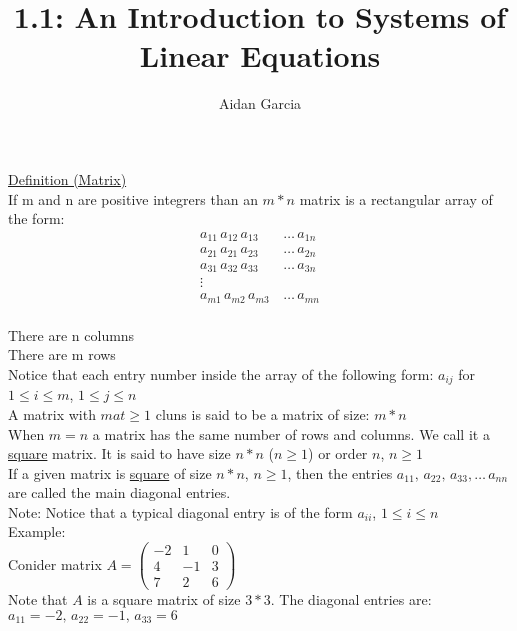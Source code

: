 \documentclass{jhwhw}
\author{Aidan Garcia}
\title{1.1: An Introduction to Systems of Linear Equations}
\begin{document}
\underline{Definition (Matrix)} \\
If m and n are positive integrers than an \(m*n\) matrix is a rectangular array of the form:\\

\begin{align*} 
a_{11}\, a_{12}\, a_{13} \, &\ldots \, a_{1n}\\
a_{21} \, a_{21} \, a_{23} \, &\ldots \, a_{2n}\\
a_{31} \, a_{32} \, a_{33} \, &\ldots \, a_{3n}\\
\vdots\\
a_{m1} \, a_{m2} \, a_{m3} \, &\ldots \, a_{mn}\\
\end{align*}

There are n columns\\
There are m rows\\

Notice that each entry {number inside the array} of the following form: \(a_{ij}\) for \(1 \leq i \leq m\), \(1 \leq j \leq n\)\\

A matrix with \(mat \geq 1\) cluns is said to be a matrix of size: \(m*n\)\\

When \(m=n\) a matrix has the same number of rows and columns. We call it a \underline{square} matrix. It is said to have size \(n*n\) (\(n \geq 1\)) or order \(n\), \(n \geq 1\)\\

If a given matrix is \underline{square} of size \(n*n\), \(n \geq 1\), then the entries \(a_{11}, \, a_{22}, \, a_{33}, \ldots \, a_{nn}\) are called the main diagonal entries.\\

Note: Notice that a typical diagonal entry is of the form \(a_{ii}\), \(1 \leq i \leq n\)\\

Example:
\\

Conider matrix \(A = \begin{pmatrix} -2 & 1 & 0 \\ 4 & -1 & 3 \\ 7 & 2 & 6 \end{pmatrix}\)\\

Note that \(A\) is a square matrix of size \(3*3\). The diagonal entries are: \(a_{11}=-2, \, a_{22}=-1, \, a_{33}=6\)\\
\end{document}
